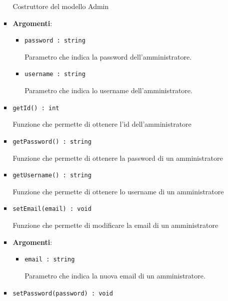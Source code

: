 \documentclass[../DefinizioneDiProdotto.tex]{subfiles}
\begin{document}
\begin{itemize}
\begin{itemize}
\begin{itemize}
	 Costruttore del modello Admin

	\item \textbf{Argomenti}:
	\begin{itemize}
	\item \texttt{password : string}\

	 Parametro che indica la password dell'amministratore.
	\item \texttt{username : string}\

	 Parametro che indica lo username dell'amministratore.
	\end{itemize}
	\end{itemize}\vspace{0.5em}
	\begin{itemize}
	\item \texttt{getId() : int}\

	 Funzione che permette di ottenere l'id dell'amministratore
	\end{itemize}\vspace{0.5em}
	\begin{itemize}
	\item \texttt{getPassword() : string}\

	 Funzione che permette di ottenere la password di un amministratore
	\end{itemize}\vspace{0.5em}
	\begin{itemize}
	\item \texttt{getUsername() : string}\

	 Funzione che permette di ottenere lo username di un amministratore
	\end{itemize}\vspace{0.5em}
	\begin{itemize}
	\item \texttt{setEmail(email) : void}\

	 Funzione che permette di modificare la email di un amministratore

	\item \textbf{Argomenti}:
	\begin{itemize}
	\item \texttt{email : string}\

	 Parametro che indica la nuova email di un amministratore.
	\end{itemize}
	\end{itemize}\vspace{0.5em}
	\begin{itemize}
	\item \texttt{setPassword(password) : void}\


\end{itemize}
\end{itemize}
\end{itemize}
\end{document}
